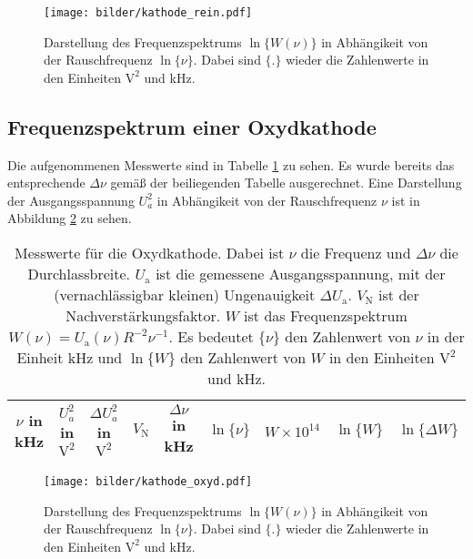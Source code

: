	\begin{figure}
		\centering
		\texttt{[image: bilder/kathode\_rein.pdf]}
		\caption{Darstellung des Frequenzspektrums $\ln\{W(\nu)\}$ in
		Abhängikeit von der Rauschfrequenz $\ln\{\nu\}$. Dabei sind $\{ . \}$ wieder
		die Zahlenwerte in den Einheiten $\text{V}^2$ und kHz.}
		\label{fig:kathode_rein}
	\end{figure}

\clearpage
\subsection{Frequenzspektrum einer Oxydkathode}

	Die aufgenommenen Messwerte sind in Tabelle
	\ref{tab:kathode_oxyd} zu sehen. Es wurde bereits das
	entsprechende $\Delta \nu$ gemäß der beiliegenden Tabelle
	ausgerechnet. Eine Darstellung der Ausgangsspannung $U_a^2$ in
	Abhängikeit von der Rauschfrequenz $\nu$ ist in Abbildung
	\ref{fig:kathode_oxyd} zu sehen.
	\begin{table}
		\centering
		\begin{tabular}{ccccccccc}
		\toprule \midrule
		$\nu$ in kHz	 & $U_a^2$ in $\text{V}^2$	& $\Delta U_a^2$ in $\text{V}^2$ &
		$V_\text{N}$	 & $\Delta \nu$ in kHz 		& $\ln \{\nu\}$				     &
		$W\times 10^{14}$&$\ln \{W\}$	 & $\ln \{\Delta W\} $ \\
		\midrule
		
		\midrule
		\bottomrule
		\end{tabular}
		\caption{Messwerte für
		die Oxydkathode. Dabei ist $\nu$ die Frequenz und $\Delta \nu$ die
		Durchlassbreite. $U_\text{a}$ ist die gemessene Ausgangsspannung, mit der
		(vernachlässigbar kleinen) Ungenauigkeit $\Delta U_\text{a}$. $V_\text{N}$
		ist der Nachverstärkungsfaktor. $W$ ist das Frequenzspektrum
		$W(\nu)=U_\text{a}(\nu) R^{-2} \nu^{-1}$. Es bedeutet $\{\nu \}$ den
		Zahlenwert von $\nu$ in der Einheit kHz und $\ln\{W\}$ den Zahlenwert
		von $W$ in den Einheiten $\text{V}^2$ und kHz.}
		\label{tab:kathode_oxyd}
	\end{table}

	\begin{figure}
		\centering
		\texttt{[image: bilder/kathode\_oxyd.pdf]}
		\caption{Darstellung des Frequenzspektrums $\ln\{W(\nu)\}$ in
		Abhängikeit von der Rauschfrequenz $\ln\{\nu\}$. Dabei sind $\{ . \}$ wieder
		die Zahlenwerte in den Einheiten $\text{V}^2$ und kHz.}
		\label{fig:kathode_oxyd}
	\end{figure}

